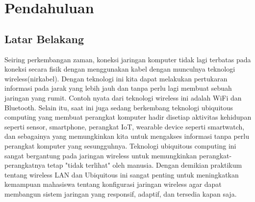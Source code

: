 \section{Pendahuluan}
\subsection{Latar Belakang}
Seiring perkembangan zaman, koneksi jaringan komputer tidak lagi terbatas pada koneksi secara fisik dengan menggunakan kabel dengan munculnya teknologi wireless(nirkabel). Dengan teknologi ini kita dapat melakukan pertukaran informasi pada jarak yang lebih jauh dan tanpa perlu lagi membuat sebuah jaringan yang rumit. Contoh nyata dari teknologi wireless ini adalah WiFi dan Bluetooth. Selain itu, saat ini juga sedang berkembang teknologi ubiquitous computing yang membuat perangkat komputer hadir disetiap aktivitas kehidupan seperti sensor, smartphone, perangkat IoT, wearable device seperti smartwatch, dan sebagainya yang memungkinkan kita untuk mengakses informasi tanpa perlu perangkat komputer yang sesungguhnya. Teknologi ubiquitous computing ini sangat bergantung pada jaringan wireless untuk memungkinkan perangkat-perangkatnya tetap "tidak terlihat" oleh manusia. Dengan demikian praktikum tentang wireless LAN dan Ubiquitous ini sangat penting untuk meningkatkan kemampuan mahasiswa tentang konfigurasi jaringan wireless agar dapat membangun sistem jaringan yang responsif, adaptif, dan tersedia kapan saja.

